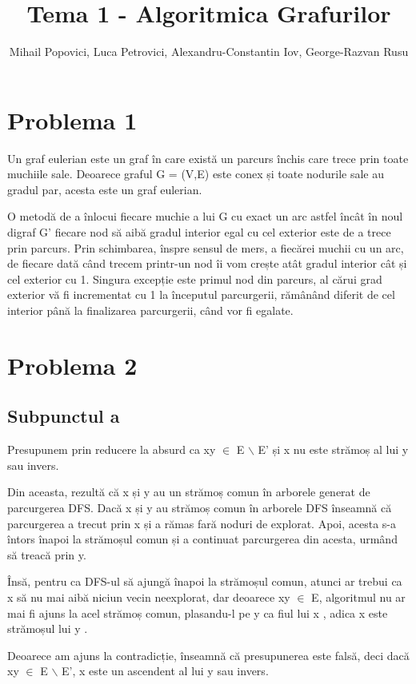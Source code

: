 \documentclass{article}
\title{Tema 1 - Algoritmica Grafurilor}
\author{Mihail Popovici, Luca Petrovici, Alexandru-Constantin Iov, George-Razvan Rusu}
\begin{document}
\maketitle

\section*{\fontsize{20}{50}\selectfont Problema 1}
{\fontsize{14}{16}\selectfont  Un graf eulerian este un graf în care există un parcurs închis care trece prin toate muchiile sale. Deoarece graful G = (V,E) este conex și toate nodurile sale au gradul par, acesta este un graf eulerian. 
\par O metodă de a înlocui fiecare muchie a lui G cu exact un arc astfel încât în noul digraf G' fiecare nod să aibă gradul interior egal cu cel exterior este de a trece prin parcurs. Prin schimbarea, înspre sensul de mers, a fiecărei muchii cu un arc, de fiecare dată când trecem printr-un nod îi vom crește atât gradul interior cât și cel exterior cu 1. Singura excepție este primul nod din parcurs, al cărui grad exterior vă fi incrementat cu 1 la începutul parcurgerii, rămânând diferit de cel interior până la finalizarea parcurgerii, când vor fi egalate.
}

\section*{\fontsize{20}{50}\selectfont Problema 2}
\subsection*{\fontsize{16}{30}\selectfont Subpunctul a}
{\fontsize{14}{16}\selectfont  Presupunem prin reducere la absurd ca xy $\in$  E $\backslash$ E' și x nu este strămoș al lui y sau invers. 
\par Din aceasta, rezultă că x și y au un strămoș comun în arborele generat de parcurgerea DFS. Dacă x și y au strămoș comun în arborele DFS înseamnă că parcurgerea a trecut prin x și a rămas fară noduri de explorat. Apoi, acesta s-a întors înapoi la strămoșul comun și a continuat parcurgerea din acesta, urmând să treacă prin y. 
\par Însă, pentru ca DFS-ul să ajungă înapoi la strămoșul comun, atunci ar trebui ca x să nu mai aibă niciun vecin neexplorat, dar deoarece xy $\in$ E, algoritmul nu ar mai fi ajuns la acel strămoș comun, plasandu-l pe y ca fiul lui x , adica x este strămoșul lui y .
\par Deoarece am ajuns la contradicție, înseamnă că presupunerea este falsă, deci dacă xy $\in$ E $\backslash$ E', x este un ascendent al lui y sau invers.
}
\end{document}
